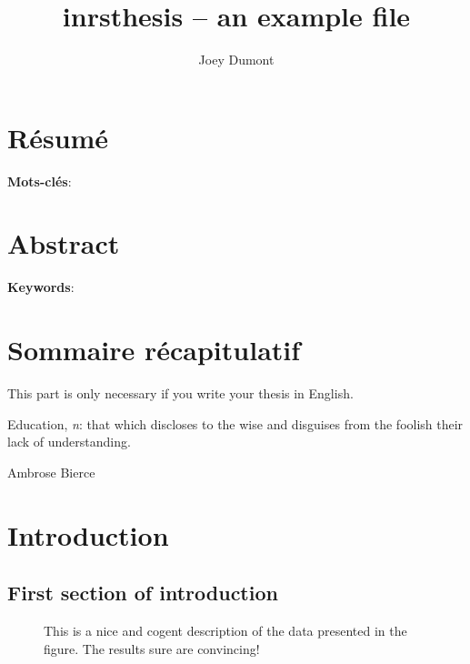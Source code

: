 \documentclass[11pt,SymmetricalJury,PhD]{inrsthesis}  %
\title{inrsthesis -- an example file}
\author{Joey Dumont}
\begin{document}
\frontmatter

\maketitle

\chapter{Résumé}

\textbf{Mots-clés}:

\chapter{Abstract}

\textbf{Keywords}:

\chapter{Sommaire récapitulatif}

This part is only necessary if you write your thesis in English.

\cleardoublepage

\tableofcontents
\cleardoublepage

\listoftables
\cleardoublepage

\listoffigures
\cleardoublepage

\dedication{I dedicate this to Mufasa, the God of Lions.}
\cleardoublepage

\epigraph{Education, \textit{n}: that which discloses to the wise and disguises
from the foolish their lack of understanding.}{Ambrose Bierce}

\cleardoublepage

\mainmatter

\chapter{Introduction}

\lipsum[1]

\section{First section of introduction}

\lipsum[2]

\begin{figure}
  \centering
  \caption[Caption goes here.]{This is a nice and cogent description
           of the data presented in the figure. The results sure are
           convincing!}
  \label{fig:test}
\end{figure}
\end{document}
